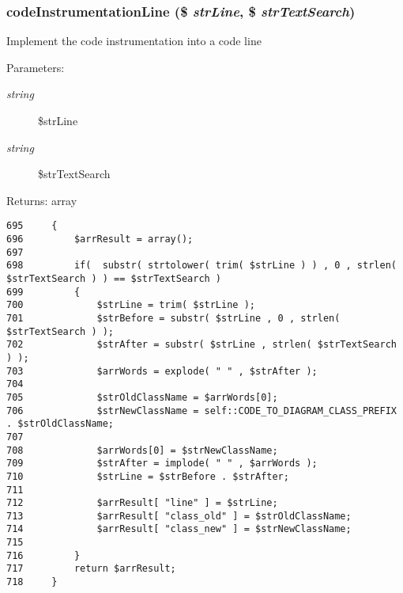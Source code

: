 \hypertarget{class_code_to_diagram_2d9bbf465fc0ace643bef01690a3336a}{
\subsubsection[{codeInstrumentationLine}]{\setlength{\rightskip}{0pt plus 5cm}codeInstrumentationLine (\$ {\em strLine}, \/  \$ {\em strTextSearch})}}
\label{class_code_to_diagram_2d9bbf465fc0ace643bef01690a3336a}


Implement the code instrumentation into a code line

\begin{Desc}
\item[Parameters:]
\begin{description}
\item[{\em string}]\$strLine \item[{\em string}]\$strTextSearch \end{description}
\end{Desc}
\begin{Desc}
\item[Returns:]array \end{Desc}


\begin{Code}\begin{verbatim}695     {
696         $arrResult = array();
697 
698         if(  substr( strtolower( trim( $strLine ) ) , 0 , strlen( $strTextSearch ) ) == $strTextSearch )
699         {
700             $strLine = trim( $strLine );
701             $strBefore = substr( $strLine , 0 , strlen( $strTextSearch ) );
702             $strAfter = substr( $strLine , strlen( $strTextSearch ) );
703             $arrWords = explode( " " , $strAfter );
704 
705             $strOldClassName = $arrWords[0];
706             $strNewClassName = self::CODE_TO_DIAGRAM_CLASS_PREFIX . $strOldClassName;
707 
708             $arrWords[0] = $strNewClassName;
709             $strAfter = implode( " " , $arrWords );
710             $strLine = $strBefore . $strAfter;
711 
712             $arrResult[ "line" ] = $strLine;
713             $arrResult[ "class_old" ] = $strOldClassName;
714             $arrResult[ "class_new" ] = $strNewClassName;
715 
716         }
717         return $arrResult;
718     }
\end{verbatim}
\end{Code}


